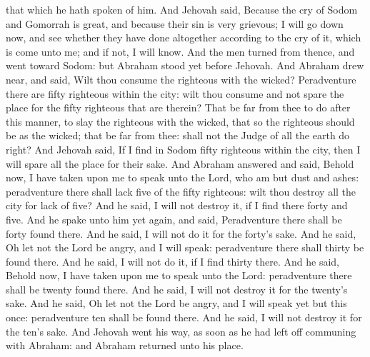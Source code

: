 that which he hath spoken of him. And Jehovah said, Because the cry of Sodom and Gomorrah is great, and because their sin is very grievous; I will go down now, and see whether they have done altogether according to the cry of it, which is come unto me; and if not, I will know.  And the men turned from thence, and went toward Sodom: but Abraham stood yet before Jehovah. And Abraham drew near, and said, Wilt thou consume the righteous with the wicked? Peradventure there are fifty righteous within the city: wilt thou consume and not spare the place for the fifty righteous that are therein? That be far from thee to do after this manner, to slay the righteous with the wicked, that so the righteous should be as the wicked; that be far from thee: shall not the Judge of all the earth do right? And Jehovah said, If I find in Sodom fifty righteous within the city, then I will spare all the place for their sake. And Abraham answered and said, Behold now, I have taken upon me to speak unto the Lord, who am but dust and ashes: peradventure there shall lack five of the fifty righteous: wilt thou destroy all the city for lack of five? And he said, I will not destroy it, if I find there forty and five. And he spake unto him yet again, and said, Peradventure there shall be forty found there. And he said, I will not do it for the forty’s sake. And he said, Oh let not the Lord be angry, and I will speak: peradventure there shall thirty be found there. And he said, I will not do it, if I find thirty there. And he said, Behold now, I have taken upon me to speak unto the Lord: peradventure there shall be twenty found there. And he said, I will not destroy it for the twenty’s sake. And he said, Oh let not the Lord be angry, and I will speak yet but this once: peradventure ten shall be found there. And he said, I will not destroy it for the ten’s sake. And Jehovah went his way, as soon as he had left off communing with Abraham: and Abraham returned unto his place. 

